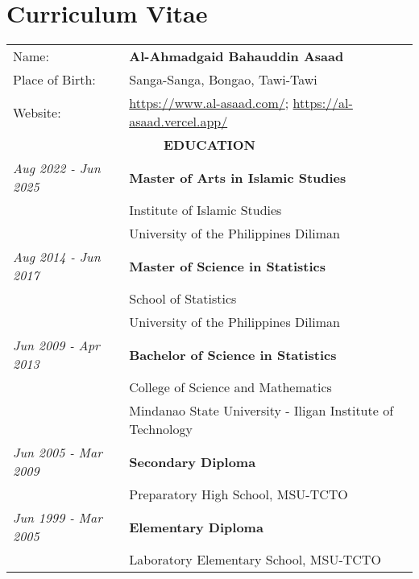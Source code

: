 \chapter*{Curriculum Vitae}
\label{ch:cv}
\begin{tabularx}{\textwidth}[!t]{ll}
Name:& \textbf{Al-Ahmadgaid Bahauddin Asaad}\\
Place of Birth:& Sanga-Sanga, Bongao, Tawi-Tawi\\
Website: & \url{https://www.al-asaad.com/}; \url{https://al-asaad.vercel.app/}\\[0.7cm]
\multicolumn{2}{c}{\bf EDUCATION}\\[0.3cm]
\textit{Aug 2022 - Jun 2025}& \textbf{Master of Arts in Islamic Studies}\\
& Institute of Islamic Studies\\
& University of the Philippines Diliman\\[0.5cm]

\textit{Aug 2014 - Jun 2017}& \textbf{Master of Science in Statistics}\\
& School of Statistics\\
& University of the Philippines Diliman\\[0.5cm]

\textit{Jun 2009 - Apr 2013}& \textbf{Bachelor of Science in Statistics}\\
& College of Science and Mathematics\\
& Mindanao State University - Iligan Institute of Technology\\[0.5cm]

\textit{Jun 2005 - Mar 2009}& \textbf{Secondary Diploma}\\
& Preparatory High School, MSU-TCTO\\[0.5cm]

\textit{Jun 1999 - Mar 2005}& \textbf{Elementary Diploma}\\
& Laboratory Elementary School, MSU-TCTO\\[0.5cm]
\end{tabularx}

